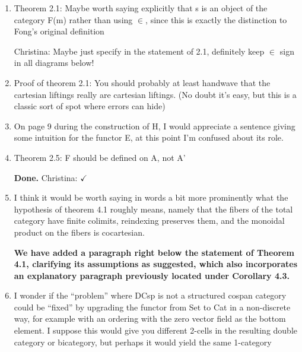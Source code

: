 \documentclass[reqno]{amsart}
\def\chris{\color{purple} Christina: }
\begin{document}
\begin{enumerate}
\item Theorem 2.1: Maybe worth saying explicitly that s is an object of the category F(m) rather than using $\in$, since this is exactly the 
distinction to 
Fong’s original definition

{\chris Maybe just specify in the statement of 2.1, definitely keep $\in$ sign in all diagrams below!}

\item Proof of theorem 2.1: You should probably at least handwave that the cartesian liftings really are cartesian liftings. (No doubt it’s easy, but 
this 
is a classic sort of spot where errors can hide)

\item On page 9 during the construction of H, I would appreciate a sentence giving some intuition for the functor E, at this point I’m confused about 
its 
role.

{}

\item Theorem 2.5: F should be defined on A, not A’

{\bf Done.} {\chris $\checkmark$}

\item I think it would be worth saying in words a bit more prominently what the hypothesis of theorem 4.1 roughly means, namely that the fibers of 
the total 
category have finite colimits, reindexing preserves them, and the monoidal product on the fibers is cocartesian.

{\bf We have added a paragraph right below the statement of Theorem 4.1, clarifying its assumptions as suggested, which also incorporates an 
explanatory paragraph previously located under Corollary 4.3.}

\item I wonder if the “problem” where DCsp is not a structured cospan category could be “fixed” by upgrading the functor from Set to Cat in a 
non-discrete 
way, for example with an ordering with the zero vector field as the bottom element. I suppose this would give you different 2-cells in the resulting 
double category or bicategory, but perhaps it would yield the same 1-category
\end{enumerate}
\end{document}
